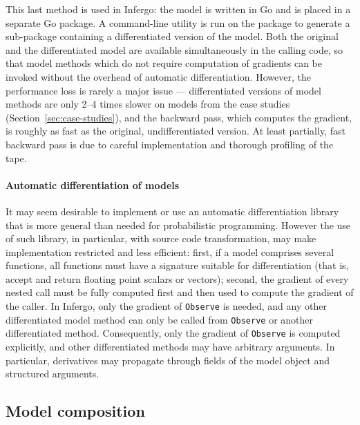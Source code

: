 \documentclass[sigplan,review,10pt,anonymous]{acmart}
\begin{document}
\begin{sloppypar}
This last method is used in Infergo: the model is written in Go
and is placed in a separate Go package. A command-line utility
is run on the package to generate a sub-package containing a
differentiated version of the model.  Both the original and the
differentiated model are available simultaneously in the calling
code, so that model methods which do not require computation of
gradients can be invoked without the overhead of automatic
differentiation.  However, the performance loss is rarely a
major issue --- differentiated versions of model methods are
only 2--4 times slower on models from the case studies
(Section~\ref{sec:case-studies}), and the backward pass, which
computes the gradient, is roughly as fast as the original,
undifferentiated version. At least partially, fast backward pass
is due to careful implementation and thorough profiling of the
tape.

\paragraph{Automatic differentiation of models}
It may seem desirable to implement or use an automatic
differentiation library that is more general than needed for
probabilistic programming. However the use of such library, in
particular, with source code transformation, may make
implementation restricted and less efficient: first, if a model
comprises several functions, all functions must have a signature
suitable for differentiation (that is, accept and return
floating point scalars or vectors); second, the gradient of
every nested call must be fully computed first and then used to
compute the gradient of the caller. In Infergo, only the
gradient of \lstinline{Observe} is needed, and any other
differentiated model method can only be called from
\lstinline{Observe} or another differentiated method.
Consequently, only the gradient of \lstinline{Observe} is
computed explicitly, and other differentiated methods may have
arbitrary arguments. In particular, derivatives may propagate
through fields of the model object and structured arguments.

\subsection{Model composition} 


\end{sloppypar}
\end{document}
